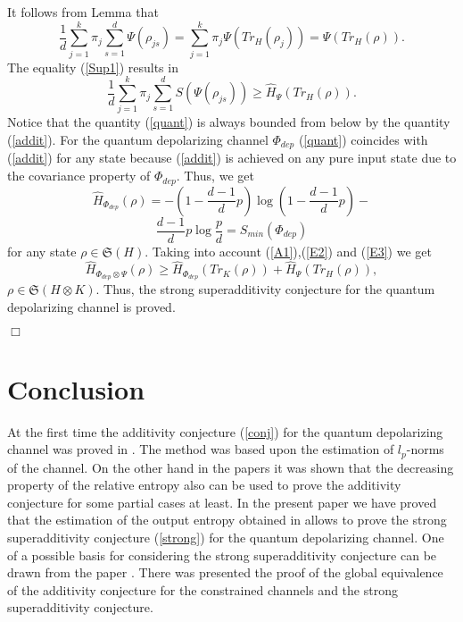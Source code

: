 \documentclass[twocolumn,showpacs,preprintnumbers,amsmath,amssymb]{revtex4}
\begin{document}
It follows from Lemma that
\begin {equation}\label {Sup1}
\frac {1}{d}\sum \limits _{j=1}^{k}\pi _{j}\sum \limits
_{s=1}^{d}\Psi (\rho_{js})=\sum \limits _{j=1}^{k}\pi _{j}\Psi (
Tr_{H}(\rho _{j}))=\Psi (Tr_{H}(\rho)).
\end {equation}
The equality (\ref {Sup1}) results in
\begin {equation}\label {E2}
\frac {1}{d}\sum \limits _{j=1}^{k}\pi _{j}\sum \limits
_{s=1}^{d}S(\Psi (\rho_{js}))\ge \hat H_{\Psi}(Tr_{H}(\rho)).
\end {equation}
Notice that the quantity (\ref {quant}) is always bounded from
below by the quantity (\ref {addit}). For the quantum
depolarizing channel $\Phi _{dep}$ (\ref {quant}) coincides with
(\ref {addit}) for any state because (\ref {addit}) is achieved on
any pure input state due to the covariance property of $\Phi
_{dep}$. Thus, we get
\begin {equation}\label {E3}
\hat H_{\Phi _{dep}}(\rho)=-(1-\frac {d-1}{d}p)\log (1-\frac
{d-1}{d}p)-
\end {equation}
$$
\frac {d-1}{d}p\log \frac {p}{d}=S_{min} (\Phi _{dep})
$$
for any state $\rho \in \mathfrak {S}(H)$. Taking into account
(\ref {A1}),(\ref {E2}) and (\ref {E3}) we get
$$
\hat H_{\Phi _{dep}\otimes \Psi}(\rho)\ge \hat H_{\Phi _{dep}
}(Tr_{K}(\rho))+\hat H_{\Psi}(Tr_{H}(\rho)),
$$
$\rho \in \mathfrak{S}(H\otimes K).$ Thus, the strong
superadditivity conjecture for the quantum depolarizing channel
is proved.



$\Box $

\section {Conclusion}

At the first time the additivity conjecture (\ref {conj}) for the
quantum depolarizing channel was proved in \cite {C02}. The method
was based upon the estimation of $l_{p}$-norms of the channel. On
the other hand in the papers \cite {Amo, Amo1, Amo2} it was shown
that the decreasing property of the relative entropy also can be
used to prove the additivity conjecture for some partial cases at
least. In the present paper we have proved that the estimation of
the output entropy obtained in \cite {C02} allows to prove the
strong superadditivity conjecture (\ref {strong}) for the quantum
depolarizing channel. One of a possible basis for considering the
strong superadditivity conjecture can be drawn from the paper
\cite {Sh}. There was presented the proof of the global
equivalence of the additivity conjecture for the constrained
channels and the strong superadditivity conjecture.
\end{document}
